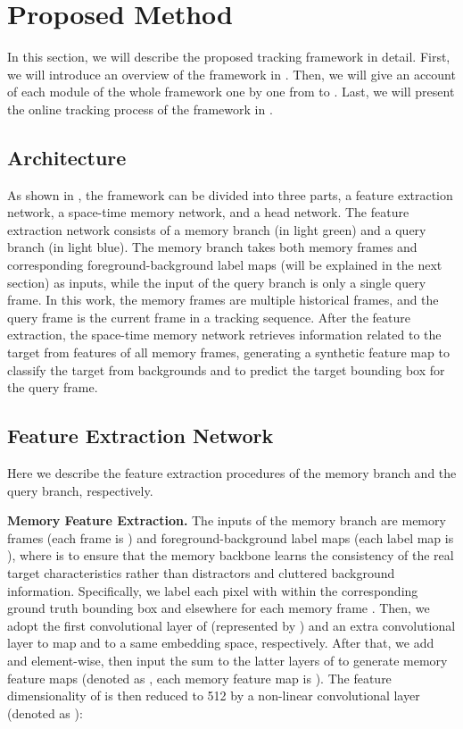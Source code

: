 \documentclass[final]{cvpr}
\begin{document}
\section{Proposed Method}
In this section, we will describe the proposed tracking framework in detail.
First, we will introduce an overview of the framework in .
Then, we will give an account of each module of the whole framework one by one from  to .
Last, we will present the online tracking process of the framework in .

\subsection{Architecture}\label{subsec:architecture}
As shown in , the framework can be divided into three parts, a feature extraction network, a space-time memory network, and a head network.
The feature extraction network consists of a memory branch (in \textcolor{color_memory_branch}{light green}) and a query branch (in \textcolor{color_query_branch}{light blue}).
The memory branch takes both memory frames and corresponding foreground-background label maps (will be explained in the next section) as inputs, while the input of the query branch is only a single query frame.
In this work, the memory frames are multiple historical frames, and the query frame is the current frame in a tracking sequence.
After the feature extraction, the space-time memory network retrieves information related to the target from features of all memory frames, generating a synthetic feature map to classify the target from backgrounds and to predict the target bounding box for the query frame.

\subsection{Feature Extraction Network}\label{subsec:feature-extraction-network}
Here we describe the feature extraction procedures of the memory branch and the query branch, respectively.
\par
\textbf{Memory Feature Extraction.}
The inputs of the memory branch are  memory frames  (each frame is ) and  foreground-background label maps  (each label map is ), where  is to ensure that the memory backbone  learns the consistency of the real target characteristics rather than distractors and cluttered background information.
Specifically, we label each pixel with  within the corresponding ground truth bounding box and  elsewhere for each memory frame .
Then, we adopt the first convolutional layer of  (represented by ) and an extra convolutional layer  to map  and  to a same embedding space, respectively.
After that, we add  and  element-wise, then input the sum to the latter layers of  to generate  memory feature maps (denoted as , each memory feature map is ).
The feature dimensionality of  is then reduced to 512 by a non-linear convolutional layer (denoted as ):
\end{document}
